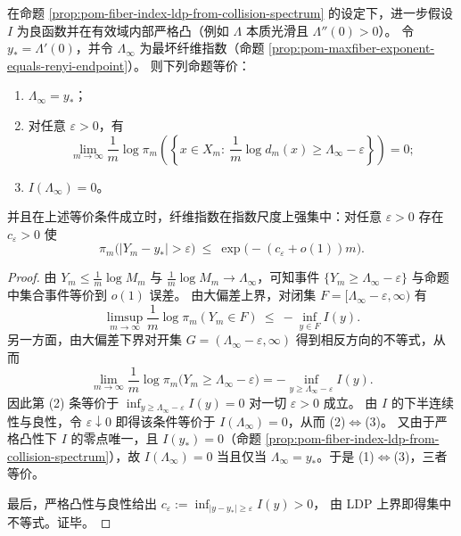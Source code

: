 \begin{proposition}[饱和相的刻画：\texorpdfstring{$\Lambda_\infty=y_\ast$}{Lambda_infty=y*} 当且仅当纤维指数在指数尺度上集中]\label{prop:pom-saturation-phase-characterization}
在命题 \ref{prop:pom-fiber-index-ldp-from-collision-spectrum} 的设定下，进一步假设 \(I\) 为良函数并在有效域内部严格凸（例如 \(\Lambda\) 本质光滑且 \(\Lambda''(0)>0\)）。
令 \(y_\ast=\Lambda'(0)\)，并令 \(\Lambda_\infty\) 为最坏纤维指数（命题 \ref{prop:pom-maxfiber-exponent-equals-renyi-endpoint}）。
则下列命题等价：
\begin{enumerate}
  \item \(\Lambda_\infty=y_\ast\)；
  \item 对任意 \(\varepsilon>0\)，有
  \[
  \lim_{m\to\infty}\frac{1}{m}\log \pi_m\!\left(\left\{x\in X_m:\ \frac{1}{m}\log d_m(x)\ge \Lambda_\infty-\varepsilon\right\}\right)=0;
  \]
  \item \(I(\Lambda_\infty)=0\)。
\end{enumerate}
并且在上述等价条件成立时，纤维指数在指数尺度上强集中：对任意 \(\varepsilon>0\) 存在 \(c_\varepsilon>0\) 使
\[
\pi_m\bigl(|Y_m-y_\ast|>\varepsilon\bigr)\ \le\ \exp\!\bigl(-(c_\varepsilon+o(1))m\bigr).
\]
\end{proposition}
\begin{proof}
由 \(Y_m\le \frac{1}{m}\log M_m\) 与 \(\frac{1}{m}\log M_m\to \Lambda_\infty\)，可知事件 \(\{Y_m\ge \Lambda_\infty-\varepsilon\}\) 与命题中集合事件等价到 \(o(1)\) 误差。
由大偏差上界，对闭集 \(F=[\Lambda_\infty-\varepsilon,\infty)\) 有
\[
\limsup_{m\to\infty}\frac{1}{m}\log \pi_m(Y_m\in F)\ \le\ -\inf_{y\in F}I(y).
\]
另一方面，由大偏差下界对开集 \(G=(\Lambda_\infty-\varepsilon,\infty)\) 得到相反方向的不等式，从而
\[
\lim_{m\to\infty}\frac{1}{m}\log \pi_m\bigl(Y_m\ge \Lambda_\infty-\varepsilon\bigr)
=-\inf_{y\ge \Lambda_\infty-\varepsilon}I(y).
\]
因此第 (2) 条等价于 \(\inf_{y\ge \Lambda_\infty-\varepsilon}I(y)=0\) 对一切 \(\varepsilon>0\) 成立。
由 \(I\) 的下半连续性与良性，令 \(\varepsilon\downarrow 0\) 即得该条件等价于 \(I(\Lambda_\infty)=0\)，从而 (2)\(\Leftrightarrow\)(3)。
又由于严格凸性下 \(I\) 的零点唯一，且 \(I(y_\ast)=0\)（命题 \ref{prop:pom-fiber-index-ldp-from-collision-spectrum}），故 \(I(\Lambda_\infty)=0\) 当且仅当 \(\Lambda_\infty=y_\ast\)。于是 (1)\(\Leftrightarrow\)(3)，三者等价。
\par
最后，严格凸性与良性给出
\(
c_\varepsilon:=\inf_{|y-y_\ast|\ge \varepsilon}I(y)>0
\)，
由 LDP 上界即得集中不等式。证毕。
\end{proof}

